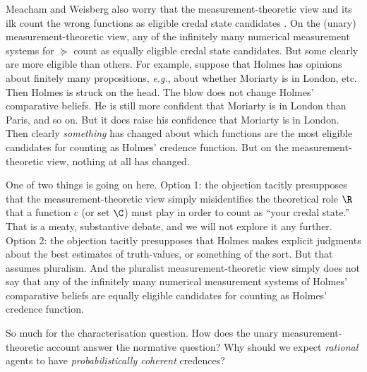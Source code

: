 Meacham and Weisberg also worry that the measurement-theoretic view and its ilk count the wrong functions as eligible credal state candidates \citep[p. 5]{Meacham2011}. On the (unary) measurement-theoretic view, any of the infinitely many numerical measurement systems for $\succeq$ count as equally eligible credal state candidates. But some clearly are more eligible than others. For example, suppose that Holmes has opinions about finitely many propositions, \textit{e.g.}, about whether Moriarty is in London, etc. Then Holmes is struck on the head. The blow does not change Holmes' comparative beliefs. He is still more confident that Moriarty is in London than Paris, and so on. But it does raise his confidence that Moriarty is in London. Then clearly \textit{something} has changed about which functions are the most eligible candidates for counting as Holmes' credence function. But on the measurement-theoretic view, nothing at all has changed.

One of two things is going on here. Option 1: the objection tacitly presupposes that the measurement-theoretic view simply misidentifies the theoretical role $\R$ that a function $c$ (or set $\C$) must play in order to count as ``your credal state.'' That is a meaty, substantive debate, and we will not explore it any further. Option 2: the objection tacitly presupposes that Holmes makes explicit judgments about the best estimates of truth-values, or something of the sort. But that assumes pluralism. And the pluralist measurement-theoretic view simply does not say that any of the infinitely many numerical measurement systems of Holmes' comparative beliefs are equally eligible candidates for counting as Holmes' credence function.

So much for the characterisation question. How does the unary measurement-theoretic account answer the normative question? Why should we expect \textit{rational} agents to have \textit{probabilistically coherent} credences? 

